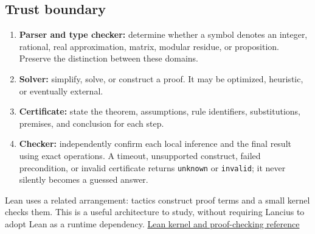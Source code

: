 \documentclass[
  10pt,
]{article}
\providecommand{\tightlist}{%
  \setlength{\itemsep}{0pt}\setlength{\parskip}{0pt}}
\begin{document}
\begin{center}
\end{center}

\subsection{Trust boundary}\label{trust-boundary}

\begin{enumerate}
\def\labelenumi{\arabic{enumi}.}
\tightlist
\item
  \textbf{Parser and type checker:} determine whether a symbol denotes
  an integer, rational, real approximation, matrix, modular residue, or
  proposition. Preserve the distinction between these domains.
\item
  \textbf{Solver:} simplify, solve, or construct a proof. It may be
  optimized, heuristic, or eventually external.
\item
  \textbf{Certificate:} state the theorem, assumptions, rule
  identifiers, substitutions, premises, and conclusion for each step.
\item
  \textbf{Checker:} independently confirm each local inference and the
  final result using exact operations. A timeout, unsupported construct,
  failed precondition, or invalid certificate returns \texttt{unknown}
  or \texttt{invalid}; it never silently becomes a guessed answer.
\end{enumerate}

Lean uses a related arrangement: tactics construct proof terms and a
small kernel checks them. This is a useful architecture to study,
without requiring Lancius to adopt Lean as a runtime dependency.
\href{https://lean-lang.org/doc/reference/latest/Elaboration-and-Compilation/}{Lean
kernel and proof-checking reference}
\end{document}

